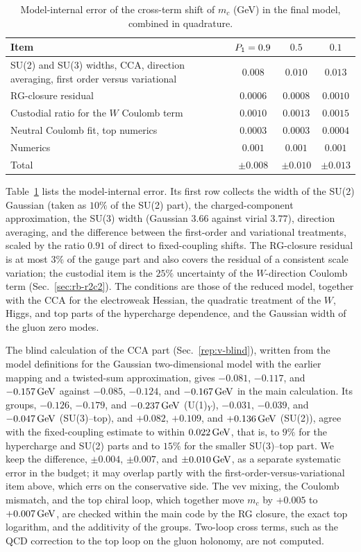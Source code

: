 \begin{table}[t]
\centering
\caption{Model-internal error of the cross-term shift of $m_c$ (GeV) in the final model, combined in quadrature.} %
\label{tab:rb-xerr}
\begin{tabular}{p{}ccc}
\toprule
Item & $P_1=0.9$ & $0.5$ & $0.1$ \\
\midrule
SU(2) and SU(3) widths, CCA, direction averaging, first order versus variational & $0.008$ & $0.010$ & $0.013$ \\ %
RG-closure residual & $0.0006$ & $0.0008$ & $0.0010$ \\ %
Custodial ratio for the $W$ Coulomb term & $0.0010$ & $0.0013$ & $0.0015$ \\ %
Neutral Coulomb fit, top numerics & $0.0003$ & $0.0003$ & $0.0004$ \\ %
Numerics & $0.001$ & $0.001$ & $0.001$ \\ %
\midrule
Total & $\pm0.008$ & $\pm0.010$ & $\pm0.013$ \\ %
\bottomrule
\end{tabular}
\end{table}

Table~\ref{tab:rb-xerr} lists the model-internal error.
Its first row collects the width of the SU(2) Gaussian (taken as $10\%$ of the SU(2) part), the charged-component approximation, the SU(3) width (Gaussian $3.66$ against virial $3.77$), direction averaging, and the difference between the first-order and variational treatments, scaled by the ratio $0.91$ of direct to fixed-coupling shifts. %
The RG-closure residual is at most $3\%$ of the gauge part and also covers the residual of a consistent scale variation; the custodial item is the $25\%$ uncertainty of the $W$-direction Coulomb term (Sec.~\ref{sec:rb-r2c2}). %
The conditions are those of the reduced model, together with the CCA for the electroweak Hessian, the quadratic treatment of the $W$, Higgs, and top parts of the hypercharge dependence, and the Gaussian width of the gluon zero modes.

The blind calculation of the CCA part (Sec.~\ref{rep:v-blind}), written from the model definitions for the Gaussian two-dimensional model with the earlier mapping and a twisted-sum approximation, gives $-0.081$, $-0.117$, and $-0.157\,\mathrm{GeV}$ against $-0.085$, $-0.124$, and $-0.167\,\mathrm{GeV}$ in the main calculation. %
Its groups, $-0.126$, $-0.179$, and $-0.237\,\mathrm{GeV}$ (U(1)$_Y$), $-0.031$, $-0.039$, and $-0.047\,\mathrm{GeV}$ (SU(3)--top), and $+0.082$, $+0.109$, and $+0.136\,\mathrm{GeV}$ (SU(2)), agree with the fixed-coupling estimate to within $0.022\,\mathrm{GeV}$, that is, to $9\%$ for the hypercharge and SU(2) parts and to $15\%$ for the smaller SU(3)--top part. %
We keep the difference, $\pm0.004$, $\pm0.007$, and $\pm0.010\,\mathrm{GeV}$, as a separate systematic error in the budget; it may overlap partly with the first-order-versus-variational item above, which errs on the conservative side. %
The vev mixing, the Coulomb mismatch, and the top chiral loop, which together move $m_c$ by $+0.005$ to $+0.007\,\mathrm{GeV}$, are checked within the main code by the RG closure, the exact top logarithm, and the additivity of the groups. %
Two-loop cross terms, such as the QCD correction to the top loop on the gluon holonomy, are not computed.

